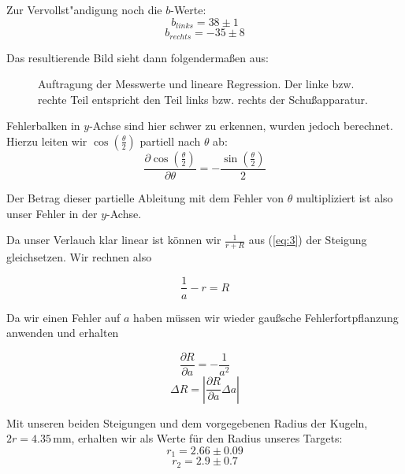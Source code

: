 \documentclass[11pt,a4paper]{article}
\begin{document}
Zur Vervollst"andigung noch die $b$-Werte:
\[b_{links}=38\pm1\]
\[b_{rechts}=-35\pm8\]

\pagebreak

Das resultierende Bild sieht dann folgenderma\ss en aus:

\begin{figure}[h]
\centering
{}
\renewcommand\thefigure{1}
\caption{Auftragung der Messwerte und lineare Regression. Der linke bzw. rechte Teil entspricht den Teil links bzw. rechts der Schu\ss apparatur.}
\label{Abb:1}
\end{figure}

Fehlerbalken in $y$-Achse sind hier schwer zu erkennen, wurden jedoch berechnet. Hierzu leiten wir $\cos\left(\frac{\theta}{2}\right)$ partiell nach $\theta$ ab:
\[
\frac{\partial\cos\left(\frac{\theta}{2}\right)}{\partial\theta}=-\frac{\sin\left(\frac{\theta}{2}\right)}{2}
\]

Der Betrag dieser partielle Ableitung mit dem Fehler von $\theta$ multipliziert ist also unser Fehler in der $y$-Achse.

Da unser Verlauch klar linear ist k\"onnen wir $\frac{1}{r+R}$ aus (\ref{eq:3}) der Steigung gleichsetzen. Wir rechnen also

\begin{equation}
\frac{1}{a}-r=R\label{eq:5}
\end{equation}

Da wir einen Fehler auf $a$ haben m\"ussen wir wieder gau\ss sche Fehlerfortpflanzung anwenden und erhalten

\[
\frac{\partial R}{\partial a}=-\frac{1}{a^2}
\]
\[
\Delta R=\left|\frac{\partial R}{\partial a}\Delta a\right|
\]

Mit unseren beiden Steigungen und dem vorgegebenen Radius der Kugeln, $2r=4.35\,\mathrm{mm}$, erhalten wir als Werte f\"ur den Radius unseres Targets:
\[r_1=2.66\pm0.09\]
\[r_2=2.9\pm0.7\]
\end{document}
